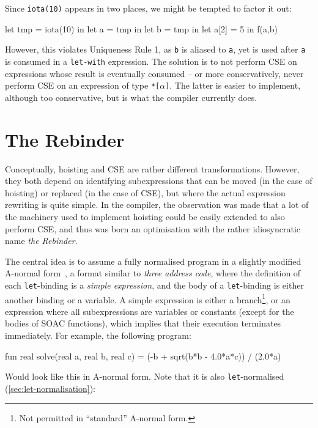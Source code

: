 Since \texttt{iota(10)} appears in two places, we might be tempted to
factor it out:

\begin{colorcode}
let tmp = iota(10) in
let a = tmp in
let b = tmp in
let a[2] = 5 in
f(a,b)
\end{colorcode}

However, this violates Uniqueness Rule 1, as \texttt{b} is aliased to
\texttt{a}, yet is used after \texttt{a} is consumed in a
\texttt{let-with} expression.  The solution is to not perform CSE on
expressions whose result is eventually consumed -- or more
conservatively, never perform CSE on an expression of type
\texttt{*[$\alpha$]}.  The latter is easier to implement, although too
conservative, but is what the \LO{} compiler currently does.

\section{The Rebinder}
\label{sec:rebinder}

Conceptually, hoisting and CSE are rather different transformations.
However, they both depend on identifying subexpressions that can be
moved (in the case of hoisting) or replaced (in the case of CSE), but
where the actual expression rewriting is quite simple.  In the \LO{}
compiler, the observation was made that a lot of the machinery used to
implement hoisting could be easily extended to also perform CSE, and
thus was born an optimisation with the rather idiosyncratic name
\textit{the Rebinder}.

The central idea is to assume a fully normalised program in a slightly
modified A-normal form~\cite{Sabry:1992:RPC:141478.141563}, a format
similar to \textit{three address code}, where the definition of each
\texttt{let}-binding is a \textit{simple expression}, and the body of
a \texttt{let}-binding is either another binding or a variable.  A
simple expression is either a branch\footnote{Not permitted in
  ``standard'' A-normal form.}, or an expression where all
subexpressions are variables or constants (except for the bodies of
SOAC functions), which implies that their execution terminates
immediately.  For example, the following program:

\begin{colorcode}
fun real solve(real a, real b, real c) =
  (-b + sqrt(b*b - 4.0*a*c)) / (2.0*a)
\end{colorcode}

Would look like this in A-normal form.  Note that it is also
\texttt{let}-normalised (\cref{sec:let-normalisation}):

